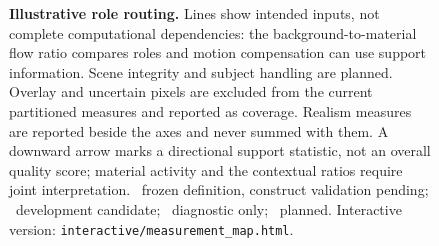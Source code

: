 \begin{figure}[t]
\caption{\textbf{Illustrative role routing.} Lines show intended inputs, not complete computational dependencies: the background-to-material flow ratio compares roles and motion compensation can use support information. Scene integrity and subject handling are planned. Overlay and uncertain pixels are excluded from the current partitioned measures and reported as coverage. Realism
measures are reported beside the axes and never summed with them. A downward arrow marks a directional support statistic, not an overall quality score; material activity and the contextual ratios require joint interpretation. \stfrozen\ frozen definition, construct validation pending; \stcand\ development candidate;
\stdiag\ diagnostic only; \stopen\ planned. Interactive version: \texttt{interactive/measurement\_map.html}.}
\label{fig:routing}
\end{figure}
